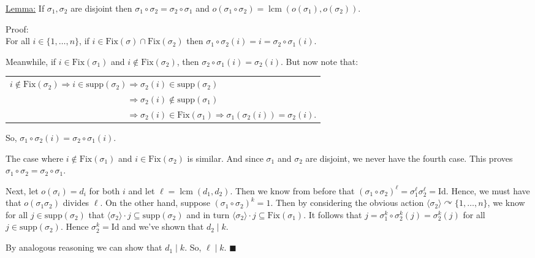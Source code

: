 \documentclass{book}
\newcommand{\exTwo}{%
   \color{Purple}%
   \fontsize{13}{15}\selectfont%
}
\newcommand{\exThreeP}{%
   \color{RedViolet}%
   \fontsize{12}{14}\selectfont%
}
\newenvironment{myIndent}{%
   \begin{adjustwidth}{2.5em}{0em}%
}{%
   \end{adjustwidth}%
}
\newcommand{\myId}{\mathrm{Id}}
\newcommand{\divides}{\mathop{\mid}}
\newcommand{\supp}{\mathrm{supp}}
\newcommand{\Fix}{\mathrm{Fix}}
\DeclareMathOperator{\lcm}{lcm}
\newcommand{\retTwo}{\hfill\bigbreak}
\begin{document}
\exTwo\ul{Lemma:} If $\sigma_1, \sigma_2$ are disjoint then $\sigma_1 \circ \sigma_2 = \sigma_2 \circ \sigma_1$ and $o(\sigma_1 \circ \sigma_2) = \lcm(o(\sigma_1), o(\sigma_2))$.
\begin{myIndent}\exThreeP
	Proof:\\
	For all $i \in \{1, \ldots, n\}$, if $i \in \Fix(\sigma) \cap \Fix(\sigma_2)$ then $\sigma_1\circ \sigma_2(i) = i = \sigma_2 \circ \sigma_1(i)$.\newpage
	
	Meanwhile, if $i \in \Fix(\sigma_1)$ and $i \notin \Fix(\sigma_2)$, then $\sigma_2 \circ \sigma_1(i) = \sigma_2(i)$. But now note that:
	
	{\centering\begin{tabular}{l}
		$i \notin \Fix(\sigma_2) \Longrightarrow i \in \supp(\sigma_2) \Longrightarrow \sigma_2(i) \in \supp(\sigma_2)$\\ [2pt]
		$\phantom{i \notin \Fix(\sigma_2) \Longrightarrow i \in \supp(\sigma_2)} \Longrightarrow \sigma_2(i) \notin \supp(\sigma_1)$\\ [2pt]
		$\phantom{i \notin \Fix(\sigma_2) \Longrightarrow i \in \supp(\sigma_2)} \Longrightarrow \sigma_2(i) \in \Fix(\sigma_1) \Longrightarrow \sigma_1(\sigma_2(i)) = \sigma_2(i)$.
	\end{tabular}\retTwo\par}

	So, $\sigma_1 \circ \sigma_2(i) = \sigma_2 \circ \sigma_1(i)$.\retTwo

	The case where $i \notin \Fix(\sigma_1)$ and $i \in \Fix(\sigma_2)$ is similar. And since $\sigma_1$ and $\sigma_2$ are disjoint, we never have the fourth case. This proves $\sigma_1 \circ \sigma_2 = \sigma_2 \circ \sigma_1$.\retTwo

	Next, let $o(\sigma_i) = d_i$ for both $i$ and let $\ell = \lcm(d_1, d_2)$. Then we know from before that $(\sigma_1 \circ \sigma_2)^\ell = \sigma_1^{\ell} \sigma_2^{\ell} = \myId$. Hence, we must have that $o(\sigma_1 \sigma_2)$ divides $\ell$. On the other hand, suppose $(\sigma_1 \circ \sigma_2)^k = 1$. Then by considering the obvious action $\langle \sigma_2 \rangle \curvearrowright \{1, \ldots, n\}$, we know for all $j \in \supp(\sigma_2)$ that $\langle \sigma_2\rangle \cdot j \subseteq \supp(\sigma_2)$ and in turn $\langle \sigma_2 \rangle \cdot j \subseteq \Fix(\sigma_1)$. It follows that $j = \sigma_1^k \circ \sigma_2^k(j) = \sigma_2^k(j)$ for all $j \in \supp(\sigma_2)$. Hence $\sigma_2^k = \myId$ and we've shown that $d_2 \divides k$.\retTwo

	By analogous reasoning we can show that $d_1 \divides k$. So, $\ell \divides k$. $\blacksquare$\retTwo
\end{myIndent}
\end{document}
